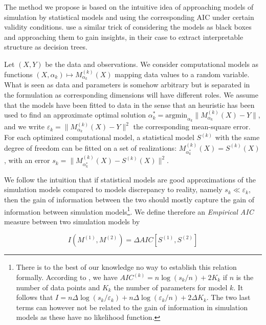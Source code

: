 \documentclass{article}
\newcommand{\norm}[1]{\| #1 \|}
\begin{document}
The method we propose is based on the intuitive idea of approaching models of simulation by statistical models and using the corresponding AIC under certain validity conditions. \cite{2017arXiv170609773B} use a similar trick of considering the models as black boxes and approaching them to gain insights, in their case to extract interpretable structure as decision trees.

Let $(X,Y)$ be the data and observations. We consider computational models as functions $(X,\alpha_k) \mapsto M_{\alpha_k}^{(k)}(X)$ mapping data values to a random variable. What is seen as data and parameters is somehow arbitrary but is separated in the formulation as corresponding dimensions will have different roles. We assume that the models have been fitted to data in the sense that an heuristic has been used to find an approximate optimal solution $\alpha^{\ast}_k = \textrm{argmin}_{\alpha_k}\norm{M_{\alpha_k}^{(k)}(X) - Y}$, and we write $\varepsilon_k = \norm{M_{\alpha_k}^{(k)}(X) - Y}^2$ the corresponding mean-square error. For each optimized computational model, a statistical model $S^{(k)}$ with the same degree of freedom can be fitted on a set of realizations: $M^{(k)}_{\alpha^{\ast}_k}(X) = S^{(k)} (X)$, with an error $s_k = \norm{M_{\alpha^{\ast}_k}^{(k)}(X) - S^{(k)}(X)}^2$.

We follow the intuition that if statistical models are good approximations of the simulation models compared to models discrepancy to reality, namely $s_k \ll \varepsilon_k$, then the gain of information between the two should mostly capture the gain of information between simulation models\footnote{There is to the best of our knowledge no way to establish this relation formally. According to \cite{navakatikyan2007model}, we have $AIC^{(k)} = n \log{\left(s_k/n\right)}+2K_k$ if $n$ is the number of data points and $K_k$ the number of parameters for model $k$. It follows that $I = n \Delta \log{\left(s_k/\varepsilon_k\right)} + n \Delta \log{\left(\varepsilon_k/n\right)} + 2 \Delta K_k$. The two last terms can however not be related to the gain of information in simulation models as these have no likelihood function.}. We define therefore an \emph{Empirical AIC} measure between two simulation models by

\begin{equation}
I\left( M^{(1)}, M^{(2)}\right) = \Delta AIC \left[S^{(1)},S^{(2)}\right]
\end{equation}
\end{document}
